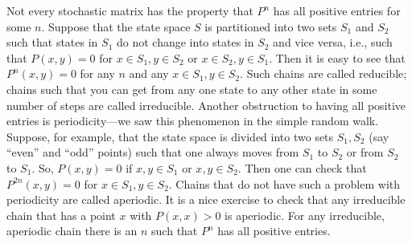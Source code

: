 \documentclass{stml-l}
\theoremstyle{definition}
\numberwithin{equation}{chapter}
\numberwithin{figure}{chapter}
\numberwithin{figure}{section}
\begin{document}
Not every stochastic matrix has the property that $P^{n}$ has all
positive entries for some $n$. Suppose that the state space $S$ is
partitioned into two sets $S_{1}$ and $S_{2}$ such that states in
$S_{1}$ do not change into states in $S_{2}$ and vice versa, i.e.,
such that $P(x,y)=0$ for $x\in S_{1},y\in S_{2}$ or $x\in S_{2},y\in
S_{1}$. Then it is easy to see that $P^{n}(x,y)=0$ for any $n$ and
any $x\in S_{1},y\in S_{2}$. Such chains are called reducible;
chains such that you can get from any one state to any other state
in some number of steps are called irreducible. Another obstruction
to having all positive entries is periodicity---we saw this
phenomenon in the simple random walk. Suppose, for example, that the
state space is divided into two sets $S_{1},S_{2}$ (say ``even'' and
``odd'' points) such that one always moves from $S_{1}$ to $S_{2}$
or from $S_{2}$ to $S_{1}$. So, $P(x,y)=0$ if $x,y\in S_{1}$ or
$x,y\in S_{2}$. Then one can check that $P^{2n}(x,y)=0$ for $x\in
S_{1},y\in S_{2}$. Chains that do not have such a problem with
periodicity are called aperiodic. It is a nice exercise to check
that any irreducible chain that has a point $x$ with $P(x,x)>0$ is
aperiodic. For any irreducible, aperiodic chain there is an $n$ such
that $P^{n}$ has all positive entries.
\end{document}
